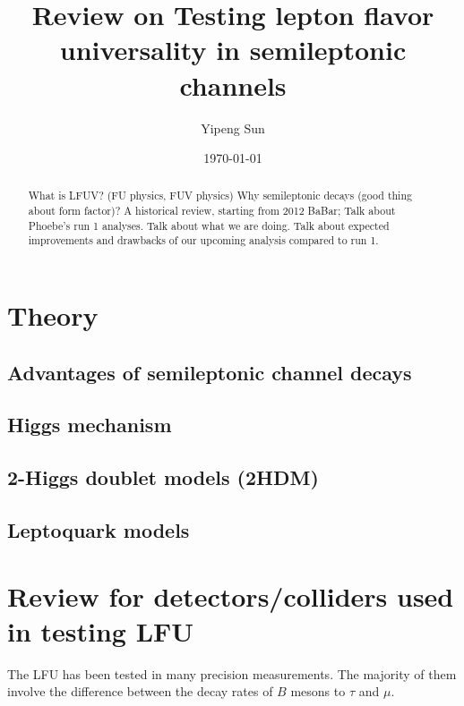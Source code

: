 \documentclass[10pt]{article}
\title{Review on Testing lepton flavor universality in semileptonic channels}
\author{Yipeng Sun}
\affil{Department of Physics, University of Maryland}
\date{\today}
\begin{document}
\maketitle

\begin{abstract}
    What is LFUV? (FU physics, FUV physics)
    Why semileptonic decays (good thing about form factor)?
    A historical review, starting from 2012 BaBar;
    Talk about Phoebe's run 1 analyses.
    Talk about what we are doing.
    Talk about expected improvements and drawbacks of our upcoming analysis compared
    to run 1.
\end{abstract}

\section{Theory}


\subsection{Advantages of semileptonic channel decays}

\subsection{Higgs mechanism}

\subsection{2-Higgs doublet models (2HDM)}

\subsection{Leptoquark models}


\section{Review for detectors/colliders used in testing LFU}
The LFU has been tested in many precision measurements.
The majority of them involve the difference between the decay rates of $B$
mesons to $\tau$ and $\mu$.
\end{document}
